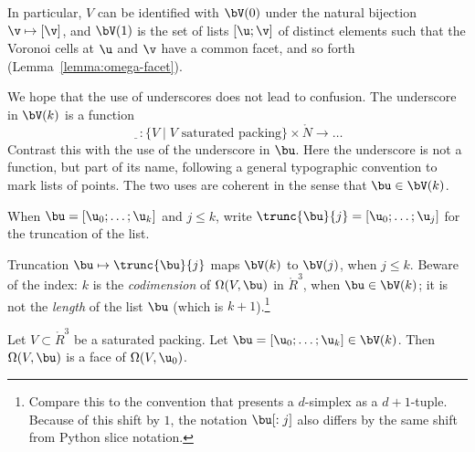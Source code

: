 In particular, $V$ can be identified with $\bV(0)$ under the natural
bijection $\v\mapsto[\v]$, and $\bV(1)$ is the set of lists $[\u;\v]$
of distinct elements such that the Voronoi cells at $ \u$ and $\v$
have a common facet, and so forth (Lemma~\ref{lemma:omega-facet}).  

\begin{notation}[underscore]
  We hope that the use of underscores does not lead to confusion.  The
  underscore in $\bV(k)$ is a function
\begin{displaymath}
\underline{\phantom V}:\{V \mid \text{$V$ saturated packing} \}
\times \ring{N} \to \ldots
\end{displaymath}
Contrast this with the use of the underscore in $\bu$.  Here the
underscore is not a function, but part of its name, following a
general typographic convention to mark lists of points. The two uses
are coherent in the sense that $\bu\in\bV(k)$.
\end{notation}

\begin{notation}[$\trunc{\bu}{j}$]
%
When $\bu=[\u_0;\ldots;\u_k]$ and $j\le k$, write
$\trunc{\bu}{j} = 
[\u_0;\ldots;\u_j]$ for the truncation of the list.  
%
\end{notation}

Truncation $\bu\mapsto\trunc{\bu}{j}$ maps $\bV(k)$ to $\bV(j)$, when
$j\le k$.  Beware of the index: $k$ is the {\it codimension} of
$\Omega(V,\bu)$ in $\ring{R}^3$, when $\bu\in \bV(k)$; it is not the
{\it length} of the list $\bu$ (which is $k+1$).\footnote{Compare this
  to the convention that presents a $d$-simplex as a $d+1$-tuple.
  Because of this shift by $1$, the notation $\bu[:j]$ also differs by
  the same shift from Python slice notation.}


\begin{lemma}\label{lemma:omega-face}  
Let $V\subset\ring{R}^3$ be a saturated packing.
Let $\bu=[\u_0;\ldots;\u_{k}]\in \bV(k)$.  
Then $\Omega(V,\bu)$ is a face of $\Omega(V,\u_0)$.
\end{lemma}

